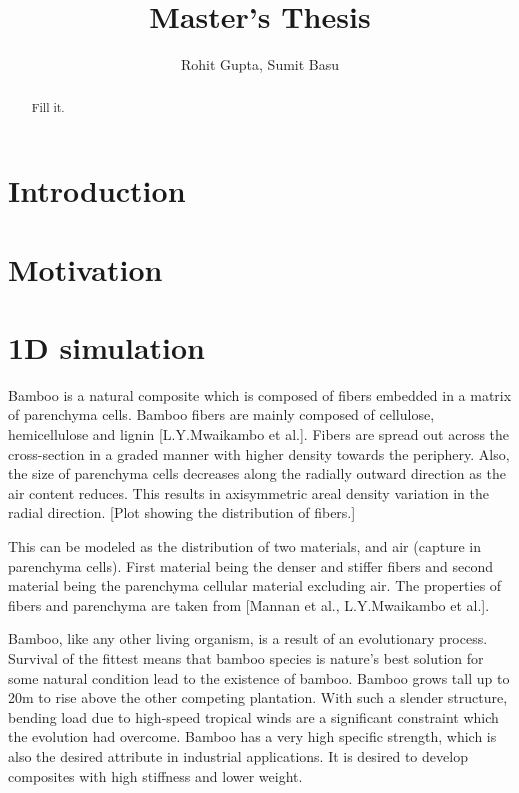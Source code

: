\documentclass[10pt]{article}
\begin{document}
\title{Master's Thesis}
\author{Rohit Gupta, Sumit Basu}

\maketitle

\begin{abstract}
Fill it.
\end{abstract}

\section{Introduction}

\newpage
\section{Motivation}
\newpage
\section{1D simulation}
Bamboo is a natural composite which is composed of fibers embedded in a matrix of parenchyma cells. Bamboo fibers are mainly composed of cellulose, hemicellulose and lignin [L.Y.Mwaikambo et al.]. Fibers are spread out across the cross-section in a graded manner with higher density towards the periphery. Also, the size of parenchyma cells decreases along the radially outward direction as the air content reduces. This results in axisymmetric areal density variation in the radial direction. [Plot showing the distribution of fibers.]\par 
This can be modeled as the distribution of two materials, and air (capture in parenchyma cells). First material being the denser and stiffer fibers and second material being the parenchyma cellular material excluding air. The properties of fibers and parenchyma are taken from [Mannan et al., L.Y.Mwaikambo et al.]. \par
Bamboo, like any other living organism, is a result of an evolutionary process. Survival of the fittest means that bamboo species is nature's best solution for some natural condition lead to the existence of bamboo. Bamboo grows tall up to 20m to rise above the other competing plantation. With such a slender structure, bending load due to high-speed tropical winds are a significant constraint which the evolution had overcome. Bamboo has a very high specific strength, which is also the desired attribute in industrial applications. It is desired to develop composites with high stiffness and lower weight.\par 
\end{document}
